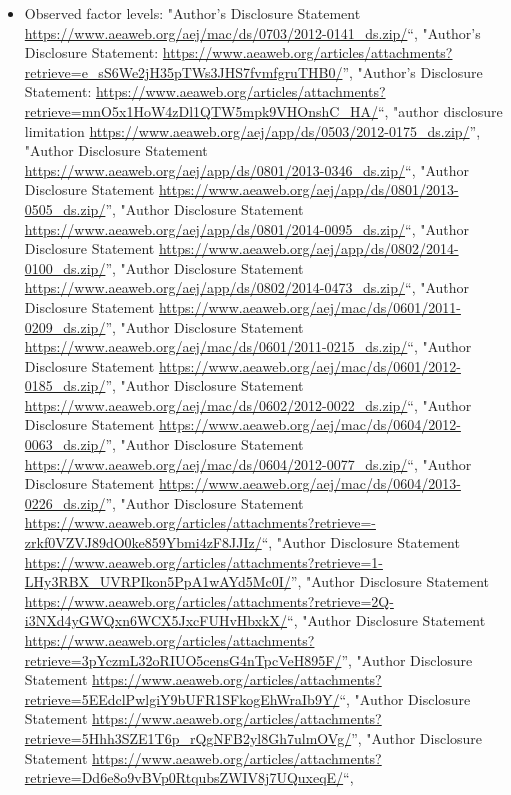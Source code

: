 \documentclass[]{article}
\providecommand{\tightlist}{%
  \setlength{\itemsep}{0pt}\setlength{\parskip}{0pt}}
\begin{document}
\begin{itemize}
\tightlist
\item
  Observed factor levels: "Author's Disclosure Statement
  \url{https://www.aeaweb.org/aej/mac/ds/0703/2012-0141_ds.zip/}``,
  "Author's Disclosure Statement:
  \url{https://www.aeaweb.org/articles/attachments?retrieve=e_sS6We2jH35pTWs3JHS7fvmfgruTHB0/}'',
  "Author's Disclosure Statement:
  \url{https://www.aeaweb.org/articles/attachments?retrieve=mnO5x1HoW4zDl1QTW5mpk9VHOnshC_HA/}``,
  "author disclosure limitation
  \url{https://www.aeaweb.org/aej/app/ds/0503/2012-0175_ds.zip/}'',
  "Author Disclosure Statement
  \url{https://www.aeaweb.org/aej/app/ds/0801/2013-0346_ds.zip/}``,
  "Author Disclosure Statement
  \url{https://www.aeaweb.org/aej/app/ds/0801/2013-0505_ds.zip/}'',
  "Author Disclosure Statement
  \url{https://www.aeaweb.org/aej/app/ds/0801/2014-0095_ds.zip/}``,
  "Author Disclosure Statement
  \url{https://www.aeaweb.org/aej/app/ds/0802/2014-0100_ds.zip/}'',
  "Author Disclosure Statement
  \url{https://www.aeaweb.org/aej/app/ds/0802/2014-0473_ds.zip/}``,
  "Author Disclosure Statement
  \url{https://www.aeaweb.org/aej/mac/ds/0601/2011-0209_ds.zip/}'',
  "Author Disclosure Statement
  \url{https://www.aeaweb.org/aej/mac/ds/0601/2011-0215_ds.zip/}``,
  "Author Disclosure Statement
  \url{https://www.aeaweb.org/aej/mac/ds/0601/2012-0185_ds.zip/}'',
  "Author Disclosure Statement
  \url{https://www.aeaweb.org/aej/mac/ds/0602/2012-0022_ds.zip/}``,
  "Author Disclosure Statement
  \url{https://www.aeaweb.org/aej/mac/ds/0604/2012-0063_ds.zip/}'',
  "Author Disclosure Statement
  \url{https://www.aeaweb.org/aej/mac/ds/0604/2012-0077_ds.zip/}``,
  "Author Disclosure Statement
  \url{https://www.aeaweb.org/aej/mac/ds/0604/2013-0226_ds.zip/}'',
  "Author Disclosure Statement
  \url{https://www.aeaweb.org/articles/attachments?retrieve=-zrkf0VZVJ89dO0ke859Ybmi4zF8JJIz/}``,
  "Author Disclosure Statement
  \url{https://www.aeaweb.org/articles/attachments?retrieve=1-LHy3RBX_UVRPIkon5PpA1wAYd5Mc0I/}'',
  "Author Disclosure Statement
  \url{https://www.aeaweb.org/articles/attachments?retrieve=2Q-i3NXd4yGWQxn6WCX5JxcFUHvHbxkX/}``,
  "Author Disclosure Statement
  \url{https://www.aeaweb.org/articles/attachments?retrieve=3pYczmL32oRIUO5censG4nTpcVeH895F/}'',
  "Author Disclosure Statement
  \url{https://www.aeaweb.org/articles/attachments?retrieve=5EEdclPwlgiY9bUFR1SFkogEhWraIb9Y/}``,
  "Author Disclosure Statement
  \url{https://www.aeaweb.org/articles/attachments?retrieve=5Hhh3SZE1T6p_rQgNFB2yl8Gh7ulmOVg/}'',
  "Author Disclosure Statement
  \url{https://www.aeaweb.org/articles/attachments?retrieve=Dd6e8o9vBVp0RtqubsZWIV8j7UQuxeqE/}``,

\end{itemize}
\end{document}
